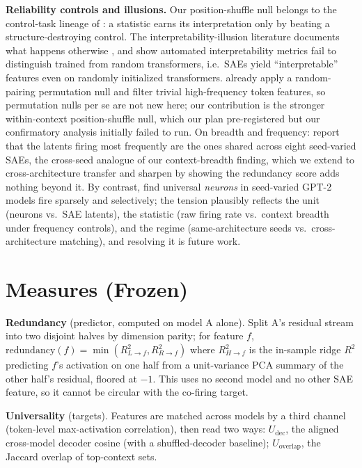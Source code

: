 \documentclass[11pt]{article}
\begin{document}
\textbf{Reliability controls and illusions.} Our position-shuffle null belongs to the control-task
lineage of \citet{hewitt2019control}: a statistic earns its interpretation only by beating a
structure-destroying control. The interpretability-illusion literature documents what happens otherwise
\citep{bolukbasi2021illusion,makelov2023illusion}, and \citet{heap2025sparse} show automated
interpretability metrics fail to distinguish trained from random transformers, i.e.\ SAEs yield
``interpretable'' features even on randomly initialized transformers. \citet{lan2024quantifying}
already apply a random-pairing permutation null and filter trivial high-frequency token features, so
permutation nulls per se are not new here; our contribution is the stronger within-context
position-shuffle null, which our plan pre-registered but our confirmatory analysis initially failed to
run. On breadth and frequency: \citet{paulo2025different} report that the latents firing most
frequently are the ones shared across eight seed-varied SAEs, the cross-seed analogue of our
context-breadth finding, which we extend to cross-architecture transfer and sharpen by showing the
redundancy score adds nothing beyond it. By contrast, \citet{gurnee2024universal} find universal
\emph{neurons} in seed-varied GPT-2 models fire sparsely and selectively; the tension plausibly
reflects the unit (neurons vs.\ SAE latents), the statistic (raw firing rate vs.\ context breadth
under frequency controls), and the regime (same-architecture seeds vs.\ cross-architecture matching),
and resolving it is future work.

\section{Measures (Frozen)}
\label{sec:measures}
\textbf{Redundancy} (predictor, computed on model A alone). Split A's residual stream into two disjoint
halves by dimension parity; for feature $f$, $\mathrm{redundancy}(f)=\min(R^2_{L\to f}, R^2_{R\to f})$
where $R^2_{H\to f}$ is the in-sample ridge $R^2$ predicting $f$'s activation on one half from a
unit-variance PCA summary of the other half's residual, floored at $-1$. This uses no second model and no
other SAE feature, so it cannot be circular with the co-firing target.

\textbf{Universality} (targets). Features are matched across models by a third channel (token-level
max-activation correlation), then read two ways: $U_{\text{dec}}$, the aligned cross-model decoder cosine
(with a shuffled-decoder baseline); $U_{\text{overlap}}$, the Jaccard overlap of top-context sets.
\end{document}
